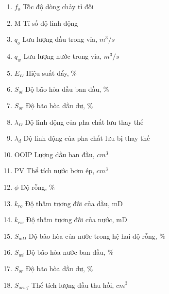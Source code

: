 \documentclass[12pt,a4paper]{article}
\begin{document}
	\begin{enumerate}
		\item[] $f_o$ \hspace*{50pt} Tốc độ dòng chảy tỉ đối
		\item[] M \hspace*{50pt} Tỉ số độ linh động 
		\item[] $q_o$ \hspace*{50pt} Lưu lượng dầu trong vỉa, $m^3/s$
		\item[] $q_w$ \hspace*{48pt} Lưu lượng nước trong vỉa, $m^3/s$
		\item[] $E_D$ \hspace*{46pt} Hiệu suất đẩy, \%
		\item[] $S_{oi}$ \hspace*{47pt} Độ bão hòa dầu ban đầu, \%
		\item[] $S_{or}$ \hspace*{47pt} Độ bão hòa dầu dư, \%
		\item[] $\lambda_D$ \hspace*{47pt} Độ linh động của pha chất lưu thay thế
		\item[] $\lambda_d$ \hspace*{50pt} Độ linh động của pha chất lưu bị thay thế
		\item[] OOIP \hspace*{34pt} Lượng dầu ban đầu, $cm^3$ 
		\item[] PV \hspace*{47pt} Thể tích nước bơm ép, $cm^3$
		\item[] $\phi$ \hspace*{54pt} Độ rỗng, \%
		\item[] $k_{ro}$ \hspace*{48pt} Độ thấm tương đối của dầu, mD
		\item[] $k_{rw}$ \hspace*{47pt} Độ thấm tương đối của nước, mD
		\item[] $S_{wD}$ \hspace*{45pt} Độ bão hòa của nước trong hệ hai độ rỗng, \%
		\item[] $S_{wi}$ \hspace*{50pt} Độ bão hòa nước ban đầu, \%
		\item[] $S_{or}$ \hspace*{50pt} Độ bão hòa dầu dư, \%
		\item[] $S_{orwf}$ \hspace*{39pt} Thể tích lượng dầu thu hồi, $cm^3$
	\end{enumerate}
\end{document}
